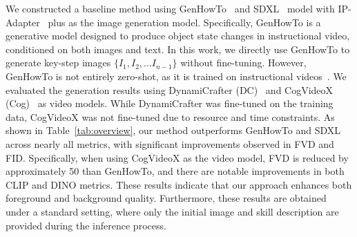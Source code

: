 
We constructed a baseline method using GenHowTo~\cite{genhowto} and SDXL~\cite{sdxl} model with IP-Adapter~\cite{ip} plus as the image generation model. Specifically, GenHowTo is a generative model designed to produce object state changes in instructional video, conditioned on both images and text. In this work, we directly use GenHowTo to generate key-step images $\{I_1,I_2,...I_{n-1}\}$ without fine-tuning. However, GenHowTo is not entirely zero-shot, as it is trained on instructional videos~\cite{crosstask,changeit}. We evaluated the generation results using DynamiCrafter (DC)~\cite{dynamicrafter} and CogVideoX (Cog)~\cite{cogvideox} as video models. While DynamiCrafter was fine-tuned on the training data, CogVideoX was not fine-tuned due to resource and time constraints. As shown in Table~\ref{tab:overview}, our method outperforms GenHowTo and SDXL across nearly all metrics, with significant improvements observed in FVD and FID. Specifically, when using CogVideoX as the video model, FVD is reduced by approximately 50 than GenHowTo, and there are notable improvements in both CLIP and DINO metrics. These results indicate that our approach enhances both foreground and background quality. Furthermore, these results are obtained under a standard setting, where only the initial image and skill description are provided during the inference process.

